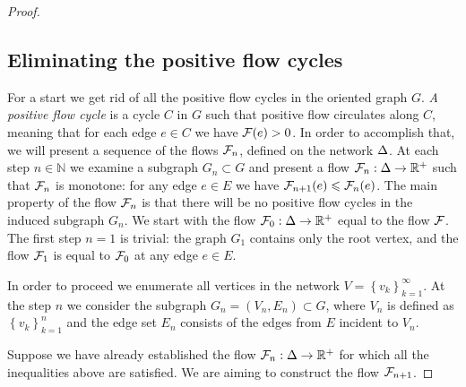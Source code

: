 \documentclass[12pt,oneside,a4paper]{amsart}
\begin{document}
\begin{proof}
      \medskip
      \subsection{Eliminating the positive flow cycles}
        For a start we get rid of all the positive flow cycles in the oriented graph $G$.
        \emph{A positive flow cycle} is a cycle $C$ in $G$ such that positive flow circulates along $C$,
          meaning that for each edge $e \in C$ we have $\mathcal{F}(e) > 0$.
        In order to accomplish that, we will present a sequence of the flows $\mathcal{F}_{n}$, defined on the network $\Delta$.
        At each step $n \in \mathbb{N}$ we examine a subgraph $G_n \subset G$ and present a flow $\mathcal{F}_{n}: \Delta \to \mathbb{R}^{+}$
          such that $\mathcal{F}_{n}$ is monotone: for any edge $e \in E$ we have $\mathcal{F}_{n+1}(e) \leqslant \mathcal{F}_{n}(e)$.
        The main property of the flow $\mathcal{F}_{n}$ is that there will be no positive flow cycles in the induced subgraph
        $G_n$.
        We start with the flow $\mathcal{F}_{0}:\Delta \to \mathbb{R}^+$ equal to the flow $\mathcal{F}$.
        The first step $n = 1$ is trivial: the graph $G_1$ contains only the root vertex, and
          the flow $\mathcal{F}_{1}$ is equal to $\mathcal{F}_{0}$ at any edge $e \in E$.

        In order to proceed we enumerate all vertices in the network $V = \left\{v_k\right\}_{k=1}^\infty$.
        At the step $n$ we consider the subgraph $G_n = (V_n, E_n) \subset G$, where $V_n$ is defined as $\left\{v_k\right\}_{k=1}^n$
          and the edge set $E_n$ consists of the edges from $E$ incident to $V_n$.

        Suppose we have already established the flow $\mathcal{F}_{n}: \Delta \to \mathbb{R}^{+}$ for which
          all the inequalities above are satisfied.
        We are aiming to construct the flow $\mathcal{F}_{n+1}$.


\end{proof}
\end{document}

